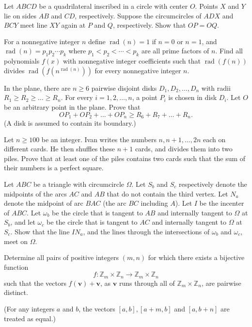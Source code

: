 \documentclass[11pt]{scrartcl}
\begin{document}
\begin{problem}[4603228855421380865]
	Let $ABCD$ be a quadrilateral inscribed in a circle with center $O$. Points $X$ and $Y$ lie on sides $AB$ and $CD$, respectively. Suppose the circumcircles of $ADX$ and $BCY$ meet line $XY$ again at $P$ and $Q$, respectively. Show that $OP=OQ$.
\end{problem}
\begin{problem}[790369865925596]
For a nonnegative integer $n$ define $\operatorname{rad}(n)=1$ if $n=0$ or $n=1$, and $\operatorname{rad}(n)=p_1p_2\cdots p_k$ where $p_1<p_2<\cdots <p_k$ are all prime factors of $n$. Find all polynomials $f(x)$ with nonnegative integer coefficients such that $\operatorname{rad}(f(n))$ divides $\operatorname{rad}(f(n^{\operatorname{rad}(n)}))$ for every nonnegative integer $n$.
\end{problem}
\begin{problem}[6654677204410680146]
In the plane, there are $n \geqslant 6$ pairwise disjoint disks $D_{1}, D_{2}, \ldots, D_{n}$ with radii $R_{1} \geqslant R_{2} \geqslant \ldots \geqslant R_{n}$. For every $i=1,2, \ldots, n$, a point $P_{i}$ is chosen in disk $D_{i}$. Let $O$ be an arbitrary point in the plane. Prove that\[O P_{1}+O P_{2}+\ldots+O P_{n} \geqslant R_{6}+R_{7}+\ldots+R_{n}.\](A disk is assumed to contain its boundary.)
\end{problem}
\begin{problem}[258585206260584]
Let $n \geqslant 100$ be an integer. Ivan writes the numbers $n, n+1, \ldots, 2 n$ each on different cards. He then shuffles these $n+1$ cards, and divides them into two piles. Prove that at least one of the piles contains two cards such that the sum of their numbers is a perfect square.
\end{problem}
\begin{problem}[844358232542368378]
Let $ABC$ be a triangle with circumcircle $\Omega$. Let $S_b$ and $S_c$ respectively denote the midpoints of the arcs $AC$ and $AB$ that do not contain the third vertex. Let $N_a$ denote the midpoint of arc $BAC$ (the arc $BC$ including $A$). Let $I$ be the incenter of $ABC$. Let $\omega_b$ be the circle that is tangent to $AB$ and internally tangent to $\Omega$ at $S_b$, and let $\omega_c$ be the circle that is tangent to $AC$ and internally tangent to $\Omega$ at $S_c$. Show that the line $IN_a$, and the lines through the intersections of $\omega_b$ and $\omega_c$, meet on $\Omega$.
\end{problem}
\begin{problem}[66110871669579]
Determine all pairs of positive integers $(m, n)$ for which there exists a bijective function\[f : \mathbb{Z}_m \times \mathbb{Z}_n \to \mathbb{Z}_m \times \mathbb{Z}_n\]such that the vectors $f(\mathbf{v}) + \mathbf{v}$, as $\mathbf{v}$ runs through all of $\mathbb{Z}_m \times \mathbb{Z}_n$, are pairwise distinct.

(For any integers $a$ and $b$, the vectors $[a, b], [a + m, b]$ and $[a, b + n]$ are treated as equal.)
\end{problem}
\end{document}
